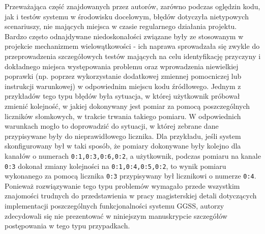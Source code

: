 Przeważająca część znajdowanych przez autorów, zarówno podczas oględzin kodu, jak i testów systemu w środowisku docelowym, błędów dotyczyła nietypowych scenariuszy, nie mających miejsca w czasie regularnego działania projektu. Bardzo często odnajdywane niedoskonałości związane były ze stosowanym w projekcie mechanizmem wielowątkowości - ich naprawa sprowadzała się zwykle do przeprowadzenia szczegółowych testów mających na celu identyfikację przyczyny i dokładnego miejsca występowania problemu oraz wprowadzenia niewielkiej poprawki (np. poprzez wykorzystanie dodatkowej zmiennej pomocniczej lub instrukcji warunkowej) w odpowiednim miejscu kodu źródłowego. Jednym z przykładów tego typu błędów była sytuacja, w której użytkownik próbował zmienić kolejność, w jakiej dokonywany jest pomiar za pomocą poszczególnych liczników słomkowych, w trakcie trwania takiego pomiaru. W odpowiednich warunkach mogło to doprowadzić do sytuacji, w której zebrane dane przypisywane były do nieprawidłowego licznika. Dla przykładu, jeśli system skonfigurowany był w taki sposób, że pomiary dokonywane były kolejno dla kanałów o numerach \lstinline{0:1,0:3,0:6,0:2}, a użytkownik, podczas pomiaru na kanale \lstinline{0:3} dokonał zmiany kolejności na \lstinline{0:1,0:4,0:5,0:2}, to wynik pomiaru wykonanego za pomocą licznika \lstinline{0:3} przypisywany był licznikowi o numerze \lstinline{0:4}. Ponieważ rozwiązywanie tego typu problemów wymagało przede wszystkim znajomości trudnych do przedstawienia w pracy magisterskiej detali dotyczących implementacji poszczególnych funkcjonalności systemu GGSS, autorzy zdecydowali się nie prezentować w niniejszym manuskrypcie szczegółów postępowania w tego typu przypadkach.

